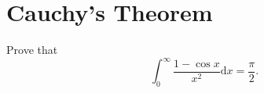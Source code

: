 
\section{Cauchy's Theorem}

\begin{exercise}{}{}
  Prove that 
  \begin{equation}
    \int_0^{\infty} \frac{1 - \cos x}{x^2}\mathrm{d} x = \frac{\pi}{2}.
  \end{equation}
\end{exercise}












